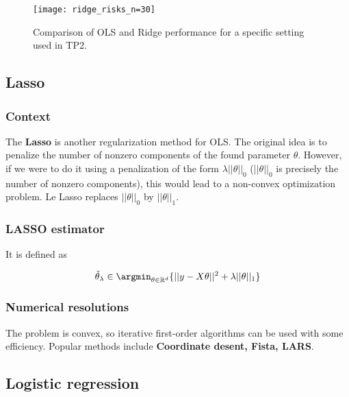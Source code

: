 \documentclass[
10pt, %
a4paper, %
oneside, %
headinclude,footinclude, %
BCOR5mm, %
]{scrartcl}
\begin{document}
\begin{figure}[htpb]
    \centering
    \texttt{[image: ridge\_risks\_n=30]}
    \caption{Comparison of OLS and Ridge performance for a specific setting
    used in TP2.}
    \label{fig:ridge_risks_n=30}
\end{figure}

\subsection{\large\color{MidnightBlue}Lasso}

\subsubsection{\large\color{Periwinkle}Context}

The \textbf{{Lasso}}  is another regularization method for OLS. The original idea is to penalize the number of nonzero components of the found parameter $\theta$. However, if we were to do it using a penalization of the form $\lambda||\theta||_0$ ($||\theta||_0$ is precisely the number of nonzero components), this would lead to a non-convex optimization problem. Le Lasso replaces $||\theta||_0$ by $ ||\theta||_1$.

\subsubsection{\large\color{Periwinkle}LASSO estimator}

It is defined as

\begin{equation}
    \tilde{\theta}_{\lambda}\in \argmin_{\theta\in \mathbb{R}^d}\{||y-X\theta||^2+\lambda ||\theta||_1\}
\end{equation}

\subsubsection{\large\color{Periwinkle}Numerical resolutions}

The problem is convex, so iterative first-order algorithms can be used with some efficiency. Popular methods include \textbf{{Coordinate desent, Fista, LARS}}.

\subsection{\large\color{MidnightBlue}Logistic regression}
\label{subsec:logistic}
\end{document}
